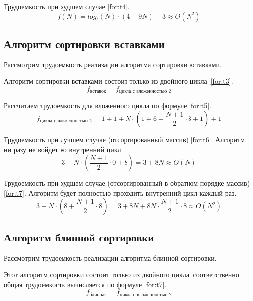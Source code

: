 Трудоемкость при худшем случае \ref{for:t4}.
\begin{equation}
\label{for:t4}
    f(N) =log_t(N) \cdot (4 + 9N) + 3 \approx O(N^2)
\end{equation}

\subsection{Алгоритм сортировки вставками}

Рассмотрим трудоемкость реализации алгоритма сортировки вставками.

Алгоритм сортировки вставками состоит только из двойного \mbox{цикла \ref{for:t3}}.
\begin{equation}
\label{for:t3}
    f_{\text{вставок}} = f_{\text{цикла с вложенностью 2}}
\end{equation}

Рассчитаем трудоемкость для вложенного цикла по формуле \ref{for:t5}.
\begin{equation}
\label{for:t5}
    f_{\text{цикла с вложенностью 2}} = 1 + 1 + N \cdot (1 + 6 + \frac{N + 1}{2} \cdot 8 + 1) + 1
\end{equation}

Трудоемкость при лучшем случае (отсортированный массив) \ref{for:t6}.
Алгоритм ни разу не войдет во внутренний цикл.
\begin{equation}
\label{for:t6}
    3 + N \cdot (\frac{N + 1}{2} \cdot 0 + 8) = 3 + 8N \approx O(N)
\end{equation}

Трудоемкость при худшем случае (отсортированный в обратном порядке массив) \ref{for:t7}.
Алгоритм будет полностью проходить внутренний цикл каждый раз.
\begin{equation}
\label{for:t7}
    3 + N \cdot (8 + \frac{N + 1}{2} \cdot 8) = 3 + 8N + 8N \cdot \frac{N + 1}{2} \cdot 8 \approx O(N^2)
\end{equation}

\subsection{Алгоритм блинной сортировки}

Рассмотрим трудоемкость реализации алгоритма блинной сортировки.

Этот алгоритм сортировки состоит только из двойного цикла, соответственно общая трудоемкость вычисляется по формуле \ref{for:t7}.
\begin{equation}
\label{for:t7}
    f_{\text{блинная}} = f_{\text{цикла с вложенностью 2}}
\end{equation}

